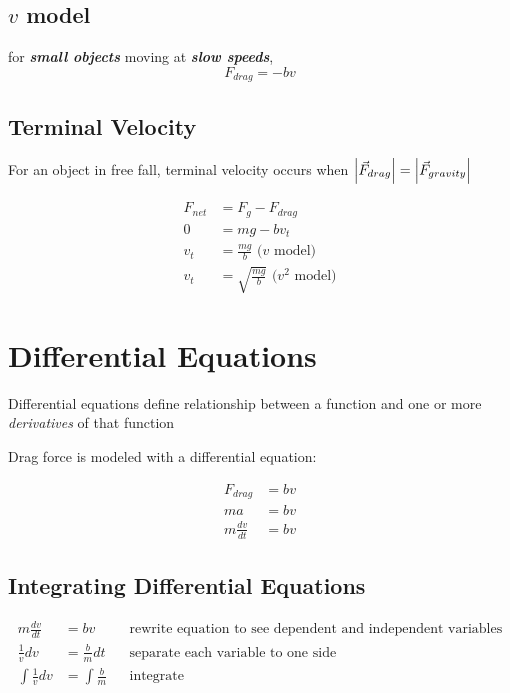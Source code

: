\documentclass[titlepage]{article}
\begin{document}
\subsection{\texorpdfstring{$v$}{v} model}
for \textbf{\emph{small objects}} moving at \textbf{\emph{slow speeds}},
\[F_{drag} = -bv\]

\subsection{Terminal Velocity}
For an object in free fall, terminal velocity occurs when $\abs{\vec{F}_{drag}} = \abs{\vec{F}_{gravity}}$

\begin{align*}
    F_{net} & = F_g - F_{drag}                             \\
    0       & = mg - bv_t                                  \\
    v_t     & = \frac{mg}{b} \text{ ($v$ model)}           \\
    v_t     & = \sqrt {\frac{mg}{b}} \text{ ($v^2$ model)}
\end{align*}

\section{Differential Equations}
Differential equations define relationship between a function and one or more \emph{derivatives} of that function

Drag force is modeled with a differential equation:

\begin{align*}
    F_{drag}        & = bv \\
    ma              & = bv \\
    m \frac{dv}{dt} & = bv
\end{align*}

\subsection{Integrating Differential Equations}
\begin{align*}
    m \frac{dv}{dt}     & = bv               &  & \text{rewrite equation to see dependent and independent variables} \\
    \frac{1}{v} dv      & = \frac{b}{m} dt   &  & \text{separate each variable to one side}                          \\
    \int \frac{1}{v} dv & = \int \frac{b}{m} &  & \text{integrate}
\end{align*}
\end{document}
